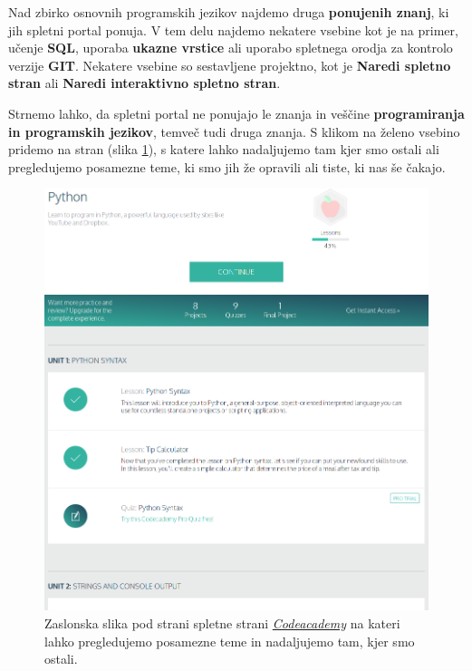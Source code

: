 Nad zbirko osnovnih programskih jezikov najdemo druga
\textbf{ponujenih znanj}, ki jih spletni portal ponuja. V tem delu
najdemo nekatere vsebine kot je na primer, učenje \textbf{SQL},
uporaba \textbf{ukazne vrstice} ali uporabo spletnega orodja za
kontrolo verzije \textbf{GIT}. Nekatere vsebine so sestavljene
projektno, kot je \textbf{Naredi spletno stran} ali \textbf{Naredi
  interaktivno spletno stran}.


Strnemo lahko, da spletni portal ne ponujajo le znanja in veščine
\textbf{programiranja in programskih jezikov}, temveč tudi druga
znanja. S klikom na želeno vsebino pridemo na stran (slika
\ref{fig:scr:web:codeacademy:tema}), s katere lahko nadaljujemo tam
kjer smo ostali ali pregledujemo posamezne teme, ki smo jih že
opravili ali tiste, ki nas še čakajo.

\begin{figure}[h!]
  \centering
    \includegraphics [width=0.65\linewidth, keepaspectratio =
    1] {./images/sc_web/codeacademy_tema_01.png}
    \caption{Zaslonska slika pod strani spletne strani
      \emph{\href{https://www.codecademy.com/}{Codeacademy}}
      \cite{web:codeacademy} na kateri lahko pregledujemo posamezne
      teme in nadaljujemo tam, kjer smo ostali.}
    \label{fig:scr:web:codeacademy:tema}
\end{figure}

